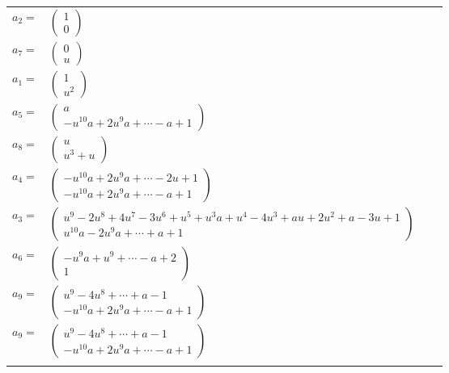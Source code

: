\documentclass[1p]{elsarticle_modified}
\theoremstyle{definition}
\begin{document}
\begin{tabular}{m{7pt} m{180pt} m{7pt} m{180pt} }
\flushright $a_{2}=$&$\begin{pmatrix}1\\0\end{pmatrix}$ \\
\flushright $a_{7}=$&$\begin{pmatrix}0\\u\end{pmatrix}$ \\
\flushright $a_{1}=$&$\begin{pmatrix}1\\u^2\end{pmatrix}$ \\
\flushright $a_{5}=$&$\begin{pmatrix}a\\- u^{10} a+2 u^9 a+\cdots- a+1\end{pmatrix}$ \\
\flushright $a_{8}=$&$\begin{pmatrix}u\\u^3+u\end{pmatrix}$ \\
\flushright $a_{4}=$&$\begin{pmatrix}- u^{10} a+2 u^9 a+\cdots-2 u+1\\- u^{10} a+2 u^9 a+\cdots- a+1\end{pmatrix}$ \\
\flushright $a_{3}=$&$\begin{pmatrix}u^9-2 u^8+4 u^7-3 u^6+u^5+u^3 a+u^4-4 u^3+a u+2 u^2+a-3 u+1\\u^{10} a-2 u^9 a+\cdots+a+1\end{pmatrix}$ \\
\flushright $a_{6}=$&$\begin{pmatrix}- u^9 a+u^9+\cdots- a+2\\1\end{pmatrix}$ \\
\flushright $a_{9}=$&$\begin{pmatrix}u^9-4 u^8+\cdots+a-1\\- u^{10} a+2 u^9 a+\cdots- a+1\end{pmatrix}$\\ \flushright $a_{9}=$&$\begin{pmatrix}u^9-4 u^8+\cdots+a-1\\- u^{10} a+2 u^9 a+\cdots- a+1\end{pmatrix}$\\&\end{tabular}
\end{document}
